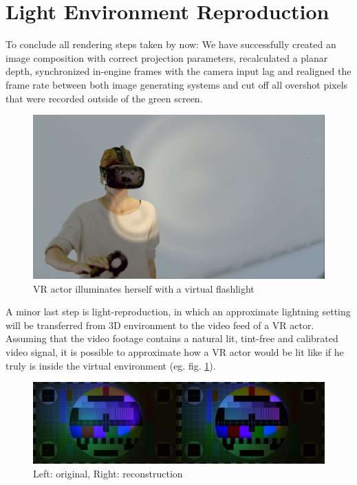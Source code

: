 %
\section{Light Environment Reproduction}

To conclude all rendering steps taken by now: We have successfully created an 
image composition with correct projection parameters, recalculated a planar 
depth, synchronized in-engine frames with the camera input lag and realigned 
the frame rate between both image generating systems and cut off all overshot 
pixels that were recorded outside of the green screen.

\begin{figure}[htbp]
	\includegraphics[width=\textwidth]{gfx/recoloring/self-illu.png}
	\caption{VR actor illuminates herself with a virtual flashlight}
	\label{fig:light-reconstruction:actor}
\end{figure}

A minor last step is light-reproduction, in which an approximate lightning 
setting will be transferred from 3D environment to the video feed of a VR 
actor. Assuming that the video footage contains a natural lit, tint-free and 
calibrated video signal, it is possible to approximate how a VR actor would 
be lit like if he truly is inside the virtual environment (eg. fig. 
\ref{fig:light-reconstruction:actor}).

\begin{figure}[htb]
	\includegraphics[width=\textwidth]{_raw_resources/light-reconstruction/comparison.jpg}
	\caption{Left: original, Right: reconstruction}
	\label{fig:light-reconstruction:diff-capture}
\end{figure}

